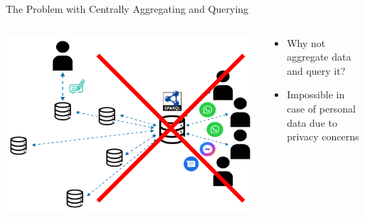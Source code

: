 \begin{frame}{The Problem with Centrally Aggregating and Querying}
    \begin{columns}[T] %
        \begin{column}{0.6\textwidth} %
            \includegraphics[width=\linewidth]{images/centralize-personal-data-stores-no.pdf} %
        \end{column}

        \begin{column}{0.4\textwidth} %
            \begin{itemize}
                \item Why not aggregate data and query it?
                \item Impossible in case of personal data due to privacy concerns
            \end{itemize}
        \end{column}
    \end{columns}
\end{frame}

